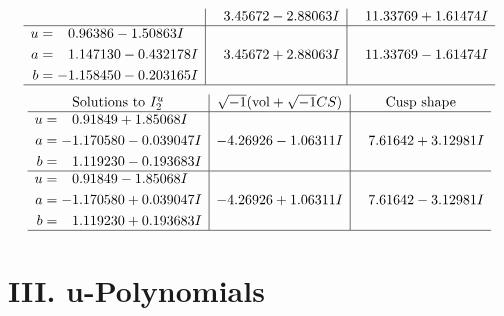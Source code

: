 \documentclass[1p]{elsarticle_modified}
\theoremstyle{definition}
\newcommand{\I}{\sqrt{-1}}
\begin{document}
$$\begin{array}{c|c|c}
 & \phantom{-}3.45672 - 2.88063 I & \phantom{-}11.33769 + 1.61474 I \\ \hline\begin{aligned}
u &= \phantom{-}0.96386 - 1.50863 I \\
a &= \phantom{-}1.147130 - 0.432178 I \\
b &= -1.158450 - 0.203165 I\end{aligned}
 & \phantom{-}3.45672 + 2.88063 I & \phantom{-}11.33769 - 1.61474 I\\
 \hline 
 \end{array}$$\newpage$$\begin{array}{c|c|c}  
\text{Solutions to }I^u_{2}& \I (\text{vol} + \sqrt{-1}CS) & \text{Cusp shape}\\
 \hline 
\begin{aligned}
u &= \phantom{-}0.91849 + 1.85068 I \\
a &= -1.170580 - 0.039047 I \\
b &= \phantom{-}1.119230 - 0.193683 I\end{aligned}
 & -4.26926 - 1.06311 I & \phantom{-}7.61642 + 3.12981 I \\ \hline\begin{aligned}
u &= \phantom{-}0.91849 - 1.85068 I \\
a &= -1.170580 + 0.039047 I \\
b &= \phantom{-}1.119230 + 0.193683 I\end{aligned}
 & -4.26926 + 1.06311 I & \phantom{-}7.61642 - 3.12981 I\\
 \hline 
 \end{array}$$\newpage
\newpage\renewcommand{\arraystretch}{1}
\centering \section*{ III. u-Polynomials}
\end{document}
